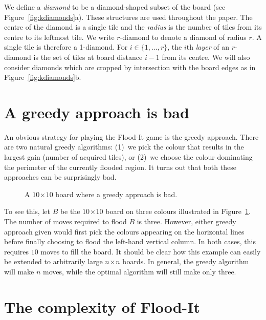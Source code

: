 \documentclass[a4paper,11pt]{llncs}
\newcommand{\pgfgraphic}[1]{}
\newcounter{l}
\newcommand{\recdim}[2]{$#1$$\mspace{1mu}$$\times$$\mspace{1mu}$$#2$}
\begin{document}
We define a \emph{diamond} to be a diamond-shaped subset of the board (see Figure~\ref{fig:kdiamonds}a). These structures are used throughout the paper. The centre of the diamond is a single tile and the \emph{radius}  is the number of tiles from its centre to its leftmost tile. We write $r$-diamond to denote a diamond of radius $r$. A single tile is therefore a 1-diamond. For $i\in \{1,\dots,r\}$, the $i$th \emph{layer} of an $r$-diamond is the set of tiles at board distance $i-1$ from its centre. We will also consider diamonds which are cropped by intersection with the board edges as in Figure~\ref{fig:kdiamonds}b.






\section{A greedy approach is bad} \label{sec:greed}
An obvious strategy for playing the Flood-It game is the greedy approach. There are two natural greedy algorithms: (1)~we pick the colour that results in the largest gain (number of acquired tiles), or (2)~we choose the colour dominating the perimeter of the currently flooded region. It turns out that both these approaches can be surprisingly bad.

\begin{figure}[t] \centering
        \centering
        \pgfgraphic{graphic-greed}
        \caption{A \recdim{10}{10} board where a greedy approach is bad.\label{fig:greedy}}
\end{figure}

To see this, let $B$ be the \recdim{10}{10} board on three colours illustrated in Figure~\ref{fig:greedy}.   The number of moves required to flood $B$ is three.  However, either greedy approach given would first pick the colours appearing on the horizontal lines before finally choosing to flood the left-hand vertical column. In both cases, this requires $10$ moves to fill the board.   It should be clear how this example can easily be extended to arbitrarily large \recdim{n}{n} boards. In general, the greedy algorithm will make $n$ moves, while the optimal algorithm will still make only three.


\section{The complexity of Flood-It} \label{sec:NPC}
\newcommand{\stl}{w}
\end{document}
